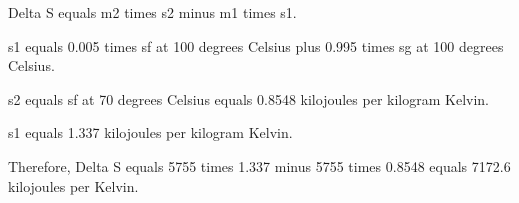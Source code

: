 Delta S equals m2 times s2 minus m1 times s1.  

s1 equals 0.005 times sf at 100 degrees Celsius plus 0.995 times sg at 100 degrees Celsius.  

s2 equals sf at 70 degrees Celsius equals 0.8548 kilojoules per kilogram Kelvin.  

s1 equals 1.337 kilojoules per kilogram Kelvin.  

Therefore, Delta S equals 5755 times 1.337 minus 5755 times 0.8548 equals 7172.6 kilojoules per Kelvin.
